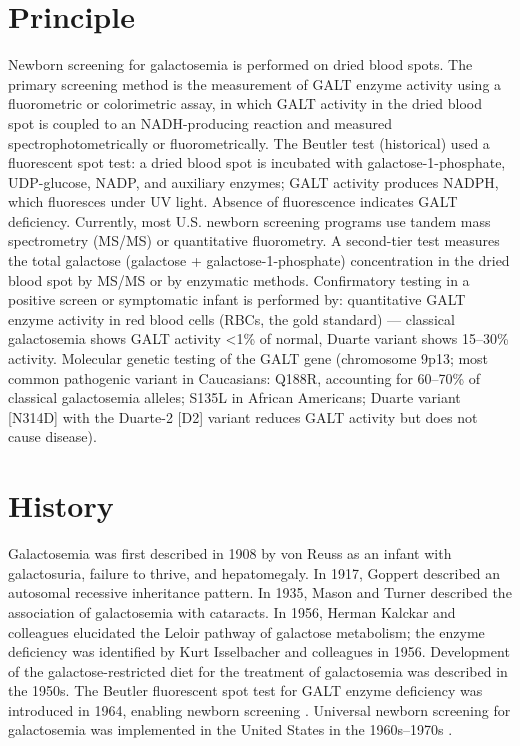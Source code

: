 \section*{Principle}
Newborn screening for galactosemia is performed on dried blood spots. The primary screening method is the measurement of GALT enzyme activity using a fluorometric or colorimetric assay, in which GALT activity in the dried blood spot is coupled to an NADH-producing reaction and measured spectrophotometrically or fluorometrically. The Beutler test (historical) used a fluorescent spot test: a dried blood spot is incubated with galactose-1-phosphate, UDP-glucose, NADP, and auxiliary enzymes; GALT activity produces NADPH, which fluoresces under UV light. Absence of fluorescence indicates GALT deficiency. Currently, most U.S. newborn screening programs use tandem mass spectrometry (MS/MS) or quantitative fluorometry. A second-tier test measures the total galactose (galactose + galactose-1-phosphate) concentration in the dried blood spot by MS/MS or by enzymatic methods. Confirmatory testing in a positive screen or symptomatic infant is performed by: quantitative GALT enzyme activity in red blood cells (RBCs, the gold standard) --- classical galactosemia shows GALT activity <1\% of normal, Duarte variant shows 15--30\% activity. Molecular genetic testing of the GALT gene (chromosome 9p13; most common pathogenic variant in Caucasians: Q188R, accounting for 60--70\% of classical galactosemia alleles; S135L in African Americans; Duarte variant [N314D] with the Duarte-2 [D2] variant reduces GALT activity but does not cause disease).

\section*{History}
Galactosemia was first described in 1908 by von Reuss as an infant with galactosuria, failure to thrive, and hepatomegaly. In 1917, Goppert described an autosomal recessive inheritance pattern. In 1935, Mason and Turner described the association of galactosemia with cataracts. In 1956, Herman Kalckar and colleagues elucidated the Leloir pathway of galactose metabolism; the enzyme deficiency was identified by Kurt Isselbacher and colleagues in 1956. Development of the galactose-restricted diet for the treatment of galactosemia was described in the 1950s. The Beutler fluorescent spot test for GALT enzyme deficiency was introduced in 1964, enabling newborn screening \cite{beutler1965new}. Universal newborn screening for galactosemia was implemented in the United States in the 1960s--1970s \cite{fridovichkeil2019galactosemia}.

